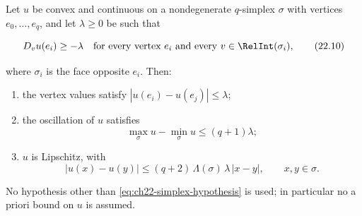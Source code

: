 \begin{lemma}
\label{lem:ch22-simplex}
Let \(u\) be convex and continuous on a nondegenerate \(q\)-simplex
\(\sigma\) with vertices \(e_0,\ldots,e_q\), and let \(\lambda\geq0\) be
such that

\[
 D_vu(e_i)\geq-\lambda
 \quad\text{for every vertex }e_i\text{ and every }
 v\in\RelInt(\sigma_i),
\tag{22.10}\label{eq:ch22-simplex-hypothesis}
\]

where \(\sigma_i\) is the face opposite \(e_i\).  Then:
\begin{enumerate}
\item\label{itm:ch22-simplex:vertices} the vertex values satisfy
\(|u(e_i)-u(e_j)|\leq\lambda\);
\item\label{itm:ch22-simplex:osc} the oscillation of \(u\) satisfies
\[
 \max_\sigma u-\min_\sigma u\leq(q+1)\lambda;
\tag{22.11}\label{eq:ch22-simplex-oscillation}
\]
\item\label{itm:ch22-simplex:lip} \(u\) is Lipschitz, with
\[
 |u(x)-u(y)|\leq(q+2)\,\Lambda(\sigma)\,\lambda\,|x-y|,
 \qquad x,y\in\sigma .
\tag{22.12}\label{eq:ch22-simplex-lipschitz}
\]
\end{enumerate}
No hypothesis other than \eqref{eq:ch22-simplex-hypothesis} is used; in
particular no a priori bound on \(u\) is assumed.
\end{lemma}

